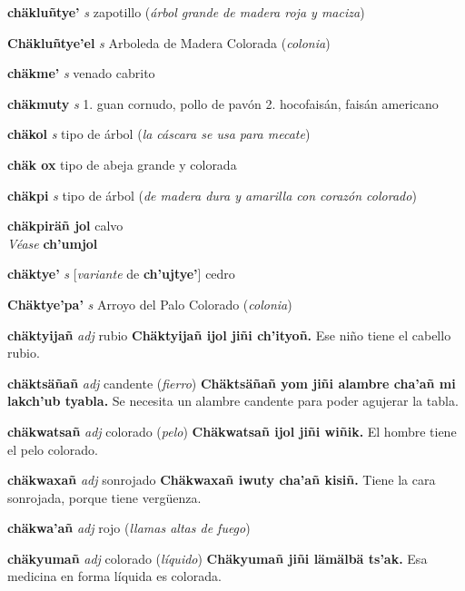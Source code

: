 \documentclass[10pt]{scrbook}
\newcommand{\entry}[1]{\textbf{#1}}
\newcommand{\onedefinition}[1]{#1.}
\newcommand{\partofspeech}[1]{\textit{#1}}
\newcommand{\spanishtranslation}[1]{#1}
\newcommand{\clarification}[1]{(\textit{#1})}
\newcommand{\cholexample}[1]{\textbf{#1}}
\newcommand{\exampletranslation}[1]{#1}
\newcommand{\alsosee}[1]{\\\textit{Véase} \textbf{#1}}
\newcommand{\conjugationtense}[1]{[\textit{#1}}
\newcommand{\conjugationverb}[1]{de \textbf{#1}]}
\begin{document}
\begin{multicols}{2}
\entry{chäkluñtye'}
\partofspeech{s}
\spanishtranslation{zapotillo}
\clarification{árbol grande de madera roja y maciza}

\entry{Chäkluñtye'el}
\partofspeech{s}
\spanishtranslation{Arboleda de Madera Colorada}
\clarification{colonia}

\entry{chäkme'}
\partofspeech{s}
\spanishtranslation{venado cabrito}

\entry{chäkmuty}
\partofspeech{s}
\onedefinition{1}
\spanishtranslation{guan cornudo, pollo de pavón}
\onedefinition{2}
\spanishtranslation{hocofaisán, faisán americano}

\entry{chäkol}
\partofspeech{s}
\spanishtranslation{tipo de árbol}
\clarification{la cáscara se usa para mecate}

\entry{chäk ox}
\spanishtranslation{tipo de abeja grande y colorada}

\entry{chäkpi}
\partofspeech{s}
\spanishtranslation{tipo de árbol}
\clarification{de madera dura y amarilla con corazón colorado}

\entry{chäkpiräñ jol}
\spanishtranslation{calvo}
\alsosee{ch'umjol}

\entry{chäktye'}
\partofspeech{s}
\conjugationtense{variante}
\conjugationverb{ch'ujtye'}
\spanishtranslation{cedro}

\entry{Chäktye'pa'}
\partofspeech{s}
\spanishtranslation{Arroyo del Palo Colorado}
\clarification{colonia}

\entry{chäktyijañ}
\partofspeech{adj}
\spanishtranslation{rubio}
\cholexample{Chäktyijañ ijol jiñi ch'ityoñ.}
\exampletranslation{Ese niño tiene el cabello rubio.}

\entry{chäktsäñañ}
\partofspeech{adj}
\spanishtranslation{candente}
\clarification{fierro}
\cholexample{Chäktsäñañ yom jiñi alambre cha'añ mi lakch'ub tyabla.}
\exampletranslation{Se necesita un alambre candente para poder agujerar la tabla.}

\entry{chäkwatsañ}
\partofspeech{adj}
\spanishtranslation{colorado}
\clarification{pelo}
\cholexample{Chäkwatsañ ijol jiñi wiñik.}
\exampletranslation{El hombre tiene el pelo colorado.}

\entry{chäkwaxañ}
\partofspeech{adj}
\spanishtranslation{sonrojado}
\cholexample{Chäkwaxañ iwuty cha'añ kisiñ.}
\exampletranslation{Tiene la cara sonrojada, porque tiene vergüenza.}

\entry{chäkwa'añ}
\partofspeech{adj}
\spanishtranslation{rojo}
\clarification{llamas altas de fuego}

\entry{chäkyumañ}
\partofspeech{adj}
\spanishtranslation{colorado}
\clarification{líquido}
\cholexample{Chäkyumañ jiñi lämälbä ts'ak.}
\exampletranslation{Esa medicina en forma líquida es colorada.}


\end{multicols}
\end{document}
